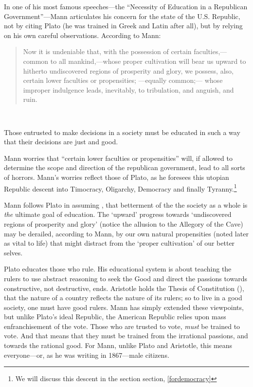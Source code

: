 In one of his most famous speeches---the ``Necessity of Education in a Republican Government''---Mann articulates his concern for the state of the U.S. Republic, not by citing Plato (he was trained in Greek and Latin after all), but by relying on his own careful observations. According to Mann:

\begin{quote}

Now it is undeniable that, with the possession of certain faculties,---common to all mankind,---whose proper cultivation will bear us upward to hitherto undiscovered regions of prosperity and glory, we possess, also, certain lower faculties or propensities; ---equally common;--- whose improper indulgence leads, inevitably, to tribulation, and anguish, and ruin. ~\citep[p. 149--150]{Mann:1867ve}
\end{quote}

 
\begin{thesis}\label{eq:citizenship}
Those entrusted to make decisions in a society must be educated in such a way that their decisions are just and good.\end{thesis} Mann worries that ``certain lower faculties or propensities'' will, if allowed to determine the scope and direction of the republican government, lead to all sorts of horrors. Mann's worries reflect those of Plato, as he foresees this utopian Republic descent into Timocracy, Oligarchy, Democracy and finally Tyranny.\footnote{We will discuss this descent in the section section, \ref{fordemocracy}} 

Mann follows Plato in assuming , that betterment of the the society as a whole is \emph{the} ultimate goal of education. The `upward' progress towards `undiscovered regions of prosperity and glory' (notice the allusion to the Allegory of the Cave) may be derailed, according to Mann, by our own natural propensities (noted later as vital to life) that might distract from the `proper cultivation' of our better selves. 

Plato educates those who rule. His educational system is about teaching the rulers to use abstract reasoning to seek the Good and direct the passions towards constructive, not destructive, ends. Aristotle holds the Thesis of Constitution (), that the nature of a country reflects the nature of its rulers; so to live in a good society, one must have good rulers. Mann has simply extended these viewpoints, but unlike Plato's ideal Republic, the American Republic relies upon mass enfranchisement of the vote. Those who are trusted to vote, \emph{must} be trained to vote. And that means that they must be trained from the irrational passions, and towards the rational good. For Mann, unlike Plato and Aristotle, this means everyone---or, as he was writing in 1867---male citizens.

